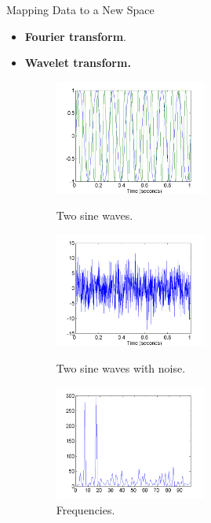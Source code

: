 \begin{frame}{Mapping Data to a New Space}
	\begin{itemize}
		\item \textbf{Fourier transform}.
		\item \textbf{Wavelet transform.}
		
		\begin{figure}
			\centering
			\begin{minipage}[b]{0.30\textwidth}
				\includegraphics[width=5cm]{img/twosinewaves.png}
				\caption{Two sine waves.}
			\end{minipage}\hfill
			\begin{minipage}[b]{0.30\textwidth}
				\includegraphics[width=5cm]{img/twosinewaveswithnoise.png}
				\caption{Two sine waves with noise.}
			\end{minipage}\hfill
			\begin{minipage}[b]{0.30\textwidth}
				\includegraphics[width=5cm]{img/frequencies.png}
				\caption{Frequencies.}
			\end{minipage}
		\end{figure}
	\end{itemize}
\end{frame}

